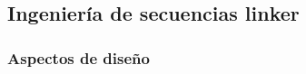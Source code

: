 \begin{itemize}
% 


\end{itemize}












     
      
\subsection{Ingeniería de secuencias linker}

\subsubsection{Aspectos de diseño}\label{aspectosDiseno}
% 
% 
% 


